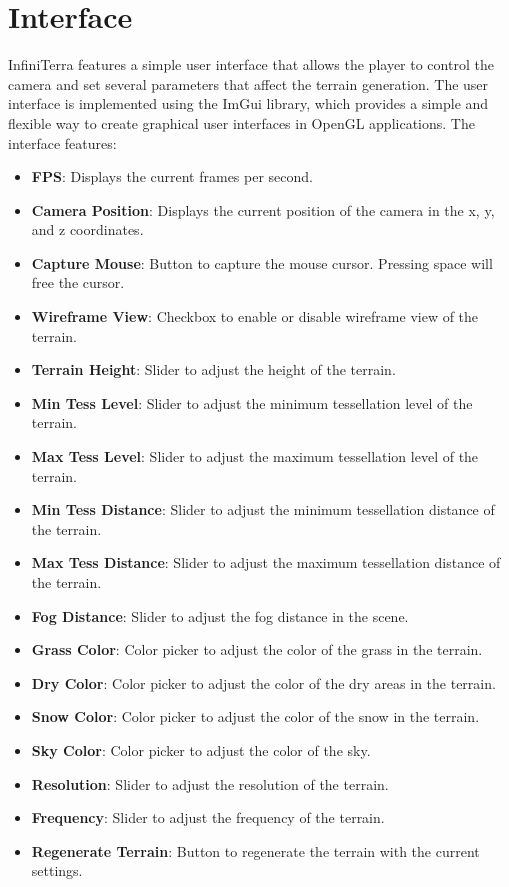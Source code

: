 \documentclass{article}
\begin{document}
\section{Interface}
\label{ch:interface}
InfiniTerra features a simple user interface that allows the player to control the camera and set
several parameters that affect the terrain generation. The user interface is implemented using the
ImGui library, which provides a simple and flexible way to create graphical user interfaces in
OpenGL applications. The interface features:
\begin{itemize}
	\item \textbf{FPS}: Displays the current frames per second.
	\item \textbf{Camera Position}: Displays the current position of the camera in the x, y, and z coordinates.
	\item \textbf{Capture Mouse}: Button to capture the mouse cursor. Pressing space will free the cursor.
	\item \textbf{Wireframe View}: Checkbox to enable or disable wireframe view of the terrain.
	\item \textbf{Terrain Height}: Slider to adjust the height of the terrain.
	\item \textbf{Min Tess Level}: Slider to adjust the minimum tessellation level of the terrain.
	\item \textbf{Max Tess Level}: Slider to adjust the maximum tessellation level of the terrain.
	\item \textbf{Min Tess Distance}: Slider to adjust the minimum tessellation distance of the terrain.
	\item \textbf{Max Tess Distance}: Slider to adjust the maximum tessellation distance of the terrain.
	\item \textbf{Fog Distance}: Slider to adjust the fog distance in the scene.
	\item \textbf{Grass Color}: Color picker to adjust the color of the grass in the terrain.
	\item \textbf{Dry Color}: Color picker to adjust the color of the dry areas in the terrain.
	\item \textbf{Snow Color}: Color picker to adjust the color of the snow in the terrain.
	\item \textbf{Sky Color}: Color picker to adjust the color of the sky.
	\item \textbf{Resolution}: Slider to adjust the resolution of the terrain.
	\item \textbf{Frequency}: Slider to adjust the frequency of the terrain.
	\item \textbf{Regenerate Terrain}: Button to regenerate the terrain with the current settings.
\end{itemize}
\end{document}

